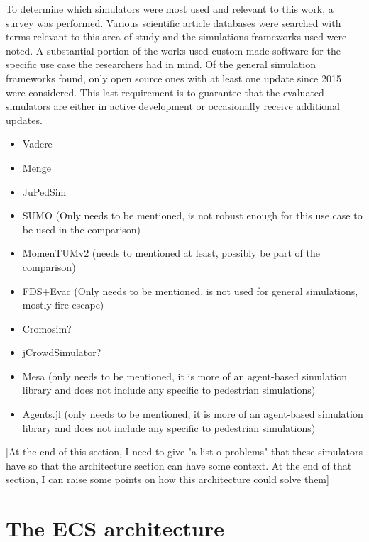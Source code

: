 \documentclass[twoside, 11pt]{article}
\begin{document}
To determine which simulators were most used and relevant to this work, a survey was performed. Various scientific article databases were searched with terms relevant to this area of study and the simulations frameworks used were noted. A substantial portion of the works used custom-made software for the specific use case the researchers had in mind. Of the general simulation frameworks found, only open source ones with at least one update since 2015 were considered. This last requirement is to guarantee that the evaluated simulators are either in active development or occasionally receive additional updates.

\begin{itemize}
  \item Vadere
  \item Menge
  \item JuPedSim
  \item SUMO (Only needs to be mentioned, is not robust enough for this use case to be used in the comparison)
  \item MomenTUMv2 (needs to mentioned at least, possibly be part of the comparison)
  \item FDS+Evac (Only needs to be mentioned, is not used for general simulations, mostly fire escape)
  \item Cromosim?
  \item jCrowdSimulator?
  \item Mesa (only needs to be mentioned, it is more of an agent-based simulation library and does not include any specific to pedestrian simulations)
  \item Agents.jl (only needs to be mentioned, it is more of an agent-based simulation library and does not include any specific to pedestrian simulations)
\end{itemize}

[At the end of this section, I need to give "a list o problems" that these simulators have so that the architecture section can have some context. At the end of that section, I can raise some points on how this architecture could solve them]

\section{The ECS architecture}
\end{document}
